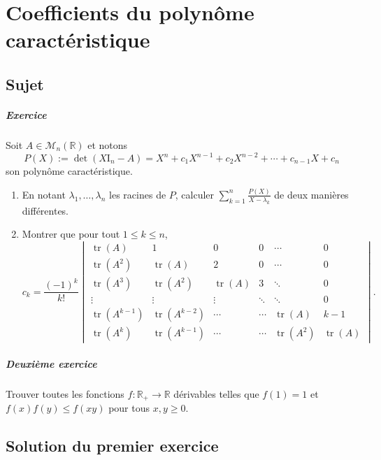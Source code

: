 \chapter{Coefficients du polynôme caractéristique}

\section{Sujet}

\paragraph{Exercice}

Soit $A \in \mathscr M_n(\mathbb R)$ et notons
\[
P(X) := \det(X\mathrm I_n - A) = X^n + c_1 X^{n-1} + c_2 X^{n-2} + \cdots + c_{n-1} X + c_n
\]
son polynôme caractéristique.
\begin{enumerate}[label = \arabic*)]
    \item En notant $\lambda_1,\dots,\lambda_n$ les racines de $P$, calculer $\sum_{k=1}^n \frac{P(X)}{X-\lambda_k}$ de deux manières différentes.
    \item Montrer que pour tout $1 \leqslant k \leqslant n$,
    \newcommand{\tr}[1]{\operatorname{tr}(#1)}
    \[
    c_k = \frac{(-1)^k}{k!}\begin{vmatrix}
         \tr{A} & 1 & 0 & 0 & \cdots & 0  \\
         \tr{A^2} & \tr{A} & 2 & 0 & \cdots & 0\\ 
         \tr{A^3} & \tr{A^2} & \tr{A} & 3 & \ddots & 0\\
         \vdots & \vdots & \vdots & \ddots & \ddots & 0\\
         \tr{A^{k-1}} & \tr{A^{k-2}} & \cdots & \cdots & \tr{A} & k-1\\
         \tr{A^k} & \tr{A^{k-1}} & \cdots & \cdots & \tr{A^2} & \tr{A}
    \end{vmatrix}.
    \]
\end{enumerate}

\paragraph{Deuxième exercice}

Trouver toutes les fonctions $f : \mathbb R_+ \to \mathbb R$ dérivables telles que $f(1)=1$ et $f(x)f(y) \leq f(xy)$ pour tous $x,y \geqslant 0$.

\section{Solution du premier exercice} %

